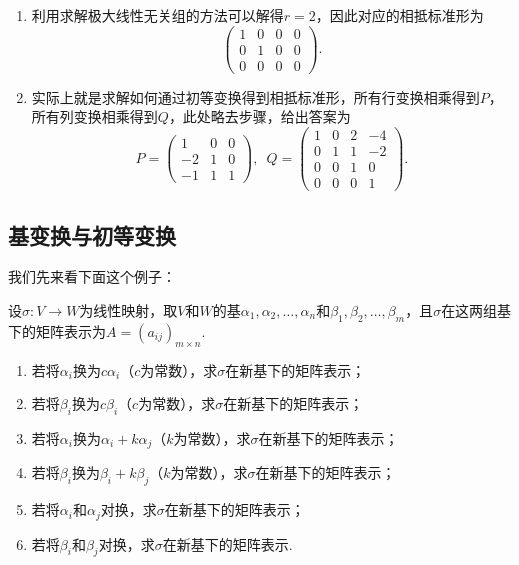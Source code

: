 \begin{solution}
    \begin{enumerate}
        \item 利用求解极大线性无关组的方法可以解得$r=2$，因此对应的相抵标准形为
              \[\begin{pmatrix}
                      1 & 0 & 0 & 0 \\ 0 & 1 & 0 & 0 \\ 0 & 0 & 0 & 0
                  \end{pmatrix}.\]

        \item 实际上就是求解如何通过初等变换得到相抵标准形，所有行变换相乘得到$P$，所有列变换相乘得到$Q$，此处略去步骤，给出答案为
              \[P=\begin{pmatrix}
                      1 & 0 & 0 \\ -2 & 1 & 0 \\ -1 & 1 & 1
                  \end{pmatrix},\enspace Q=\begin{pmatrix}
                      1 & 0 & 2 & -4 \\ 0 & 1 & 1 & -2 \\ 0 & 0 & 1 & 0 \\ 0 & 0 & 0 & 1
                  \end{pmatrix}.\]
    \end{enumerate}
\end{solution}

\subsection{基变换与初等变换}

我们先来看下面这个例子：
\begin{example}{}{}
    设$\sigma:V\to W$为线性映射，取$V$和$W$的基$\alpha_1,\alpha_2,\ldots,\alpha_n$和$\beta_1,\beta_2,\ldots,\beta_m$，且$\sigma$在这两组基下的矩阵表示为$A=(a_{ij})_{m\times n}$.
    \begin{enumerate}
        \item 若将$\alpha_i$换为$c\alpha_i$（$c$为常数），求$\sigma$在新基下的矩阵表示；

        \item 若将$\beta_i$换为$c\beta_i$（$c$为常数），求$\sigma$在新基下的矩阵表示；

        \item 若将$\alpha_i$换为$\alpha_i+k\alpha_j$（$k$为常数），求$\sigma$在新基下的矩阵表示；

        \item 若将$\beta_i$换为$\beta_i+k\beta_j$（$k$为常数），求$\sigma$在新基下的矩阵表示；

        \item 若将$\alpha_i$和$\alpha_j$对换，求$\sigma$在新基下的矩阵表示；

        \item 若将$\beta_i$和$\beta_j$对换，求$\sigma$在新基下的矩阵表示.
    \end{enumerate}
\end{example}

